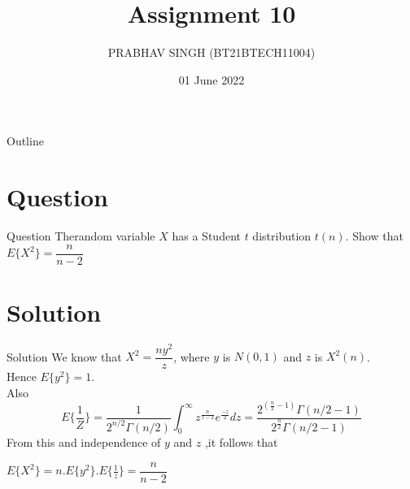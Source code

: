 \documentclass{beamer}
\title{Assignment 10}
\author{PRABHAV SINGH (BT21BTECH11004)}
\date{01 June 2022}
\begin{document}
	
	\begin{frame}
		\titlepage 
	\end{frame}
	
	\logo{}
	
	
	\begin{frame}{Outline}
		\tableofcontents
	\end{frame}
	
	\section{Question}
	\begin{frame}{Question}
	Therandom variable $ X  $ has a Student $ t $ distribution $  t(n) $. Show that \\
	$E\{ X^{2} \}=\dfrac{n}{n-2}  $
	\end{frame}
	
	
	\section{Solution}
	\begin{frame}{Solution}
We know that $  X^{2}=\dfrac{ny^{2}}{z} $, where $ y $ is $  N(0,1)  $ and $  z $ is $ X^{2}(n) $.\\ Hence $E\{ y^{2} \}=1.  $\\
Also 
\begin{equation}
	E\{\frac{1}{Z}\}=\dfrac{1}{2^{n/2}{\Gamma}(n/2)}\int_{0}^{{\infty}}z^{\frac{n}{z-2}}e^{\frac{-z}{2}}dz=\dfrac{2^{(\frac{n}{2}-1)}{\Gamma}(n/2-1)}{2^{\frac{n}{2}}{\Gamma}(n/2-1)}
\end{equation}  
From this and independence of $  y $ and $ z $ ,it follows that

$ E\{X^{2} \} = n.E\{y^{2}\}.E\{\frac{1}{z}\} = \dfrac{n}{n-2} $
\end{frame}
\end{document}
